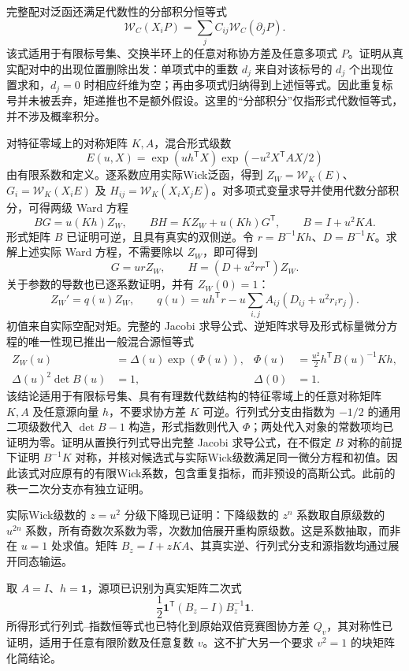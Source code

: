 \documentclass[UTF8,11pt,fontset=fandol]{ctexart}
\begin{document}
完整配对泛函还满足代数性的分部积分恒等式
\[
 \mathcal W_C(X_iP)=\sum_j C_{ij}\mathcal W_C(\partial_jP).
\]
该式适用于有限标号集、交换半环上的任意对称协方差及任意多项式 $P$。证明从真实配对中的出现位置删除出发：单项式中的重数 $d_j$ 来自对该标号的 $d_j$ 个出现位置求和，$d_j=0$ 时相应纤维为空；再由多项式归纳得到上述恒等式。因此重复标号并未被丢弃，矩递推也不是额外假设。这里的“分部积分”仅指形式代数恒等式，并不涉及概率积分。

对特征零域上的对称矩阵 $K,A$，混合形式级数
\[
 E(u,X)=\exp(u h^{\mathsf T}X)\exp(-u^2X^{\mathsf T}AX/2)
\]
由有限系数和定义。逐系数应用实际Wick泛函，得到 $Z_W=\mathcal W_K(E)$、$G_i=\mathcal W_K(X_iE)$ 及 $H_{ij}=\mathcal W_K(X_iX_jE)$。对多项式变量求导并使用代数分部积分，可得两级 Ward 方程
\[
 B G=u(Kh)Z_W,\qquad B H=KZ_W+u(Kh)G^{\mathsf T},\qquad B=I+u^2KA.
\]
形式矩阵 $B$ 已证明可逆，且具有真实的双侧逆。令 $r=B^{-1}Kh$、$D=B^{-1}K$。求解上述实际 Ward 方程，不需要除以 $Z_W$，即可得到
\[
 G=urZ_W,\qquad H=(D+u^2rr^{\mathsf T})Z_W.
\]
关于参数的导数也已逐系数证明，并有 $Z_W(0)=1$：
\[
 Z_W'=q(u)Z_W,\qquad
 q(u)=u h^{\mathsf T}r-u\sum_{i,j}A_{ij}(D_{ij}+u^2r_ir_j).
\]
初值来自实际空配对矩。完整的 Jacobi 求导公式、逆矩阵求导及形式标量微分方程的唯一性现已推出一般混合源恒等式
\[
 \begin{aligned}
 Z_W(u)&=\Delta(u)\exp(\Phi(u)),&
 \Phi(u)&=\frac{u^2}{2}h^{\mathsf T}B(u)^{-1}Kh,\\
 \Delta(u)^2\det B(u)&=1,& \Delta(0)&=1.
 \end{aligned}
\]
该结论适用于有限标号集、具有有理数代数结构的特征零域上的任意对称矩阵 $K,A$ 及任意源向量 $h$，不要求协方差 $K$ 可逆。行列式分支由指数为 $-1/2$ 的通用二项级数代入 $\det B-1$ 构造，形式指数则代入 $\Phi$；两处代入对象的常数项均已证明为零。证明从置换行列式导出完整 Jacobi 求导公式，在不假定 $B$ 对称的前提下证明 $B^{-1}K$ 对称，并核对候选式与实际Wick级数满足同一微分方程和初值。因此该式对应原有的有限Wick系数，包含重复指标，而非预设的高斯公式。此前的秩一二次分支亦有独立证明。

实际Wick级数的 $z=u^2$ 分级下降现已证明：下降级数的 $z^n$ 系数取自原级数的 $u^{2n}$ 系数，所有奇数次系数为零，次数加倍展开重构原级数。这是系数抽取，而非在 $u=1$ 处求值。矩阵 $B_z=I+zKA$、其真实逆、行列式分支和源指数均通过展开同态输运。

取 $A=I$、$h=\mathbf1$，源项已识别为真实矩阵二次式
\[
 \frac12\mathbf1^{\mathsf T}(B_z-I)B_z^{-1}\mathbf1.
\]
所得形式行列式–指数恒等式也已特化到原始双倍竞赛图协方差 $Q_v$，其对称性已证明，适用于任意有限阶数及任意复数 $v$。这不扩大另一个要求 $v^2=1$ 的块矩阵化简结论。
\end{document}
